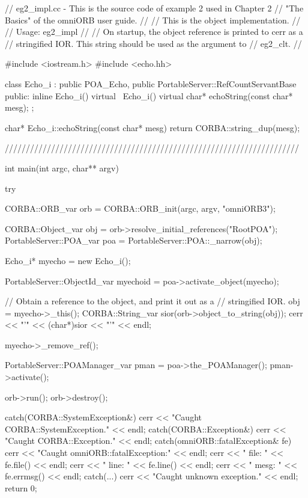 \documentclass[11pt,twoside,a4paper]{book}
\begin{document}
\begin{cxxlisting}
// eg2_impl.cc - This is the source code of example 2 used in Chapter 2
//               "The Basics" of the omniORB user guide.
//
//               This is the object implementation.
//
// Usage: eg2_impl
//
//        On startup, the object reference is printed to cerr as a
//        stringified IOR. This string should be used as the argument to 
//        eg2_clt.
//

#include <iostream.h>
#include <echo.hh>

class Echo_i : public POA_Echo,
	       public PortableServer::RefCountServantBase
{
public:
  inline Echo_i() {}
  virtual ~Echo_i() {}
  virtual char* echoString(const char* mesg);
};

char* Echo_i::echoString(const char* mesg)
{
  return CORBA::string_dup(mesg);
}

//////////////////////////////////////////////////////////////////////

int main(int argc, char** argv)
{
  try {
    CORBA::ORB_var orb = CORBA::ORB_init(argc, argv, "omniORB3");

    CORBA::Object_var obj = orb->resolve_initial_references("RootPOA");
    PortableServer::POA_var poa = PortableServer::POA::_narrow(obj);

    Echo_i* myecho = new Echo_i();

    PortableServer::ObjectId_var myechoid = poa->activate_object(myecho);

    // Obtain a reference to the object, and print it out as a
    // stringified IOR.
    obj = myecho->_this();
    CORBA::String_var sior(orb->object_to_string(obj));
    cerr << "'" << (char*)sior << "'" << endl;

    myecho->_remove_ref();

    PortableServer::POAManager_var pman = poa->the_POAManager();
    pman->activate();

    orb->run();
    orb->destroy();
  }
  catch(CORBA::SystemException&) {
    cerr << "Caught CORBA::SystemException." << endl;
  }
  catch(CORBA::Exception&) {
    cerr << "Caught CORBA::Exception." << endl;
  }
  catch(omniORB::fatalException& fe) {
    cerr << "Caught omniORB::fatalException:" << endl;
    cerr << "  file: " << fe.file() << endl;
    cerr << "  line: " << fe.line() << endl;
    cerr << "  mesg: " << fe.errmsg() << endl;
  }
  catch(...) {
    cerr << "Caught unknown exception." << endl;
  }
  return 0;
}
\end{cxxlisting}
\end{document}
